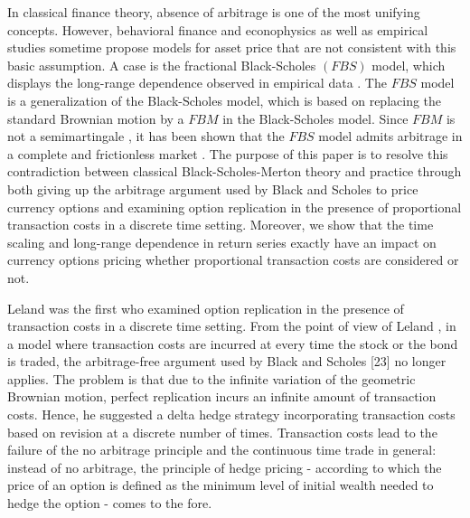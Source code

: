 \documentclass[a4paper,11pt]{amsart}
\numberwithin{equation}{section}
\theoremstyle{definition}
\theoremstyle{plain}
\theoremstyle{definition}
\newcommand{\1}{\mathbf{1}}
\begin{document}
In classical finance theory, absence of arbitrage is one of the most unifying concepts. However, behavioral finance and
econophysics as well as empirical studies sometime propose models for asset price that are not consistent with this basic
assumption. A case is the fractional Black-Scholes $(FBS)$ model, which displays the long-range dependence observed in empirical
data \cite{ozdemir,mandelbrot1,mariani}. The $FBS$ model is a generalization of the Black-Scholes model, which is based on replacing the standard Brownian motion by a $FBM$ in the Black-Scholes model. Since $FBM$ is not a semimartingale \cite{liptser}, it has been shown that the $FBS$ model admits arbitrage in a complete and frictionless market \cite{cheridito,rogers,salopek,wang2010scaling0,shokrollahi2}. The purpose of this paper is to resolve this contradiction between classical Black-Scholes-Merton theory and practice through both giving up the arbitrage argument used by Black and Scholes to price currency options and examining option replication in the presence of proportional transaction costs in a discrete time setting. Moreover, we show that the time scaling and long-range dependence in return series exactly have an impact on currency options pricing whether proportional transaction costs are considered or not.

Leland \cite{leland} was the first who examined option replication in the presence of transaction costs in a discrete time setting.
From the point of view of Leland \cite{leland}, in a model where transaction costs are incurred at every time the stock or the bond is
traded, the arbitrage-free argument used by Black and Scholes [23] no longer applies. The problem is that due to the infinite
variation of the geometric Brownian motion, perfect replication incurs an infinite amount of transaction costs. Hence, he
suggested a delta hedge strategy incorporating transaction costs based on revision at a discrete number of times. Transaction
costs lead to the failure of the no arbitrage principle and the continuous time trade in general: instead of no arbitrage, the
principle of hedge pricing - according to which the price of an option is defined as the minimum level of initial wealth
needed to hedge the option - comes to the fore.
\end{document}
